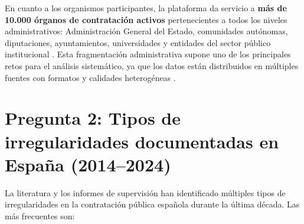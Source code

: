 \documentclass[11pt,a4paper,spanish]{book}
\numberwithin{equation}{chapter}
\numberwithin{figure}{chapter}
\begin{document}
En cuanto a los organismos participantes, la plataforma da servicio a \textbf{m{\'a}s de 10.000 {\'o}rganos de contrataci{\'o}n activos} pertenecientes a todos los niveles administrativos: Administraci{\'o}n General del Estado, comunidades aut{\'o}nomas, diputaciones, ayuntamientos, universidades y entidades del sector p{\'u}blico institucional \cite{MinHacienda2024PLACE}. Esta fragmentaci{\'o}n administrativa supone uno de los principales retos para el an{\'a}lisis sistem{\'a}tico, ya que los datos est{\'a}n distribuidos en m{\'u}ltiples fuentes con formatos y calidades heterog{\'e}neas \cite{OCP2023EUOpenData}.

\section{Pregunta 2: Tipos de irregularidades documentadas en Espa{\~n}a (2014--2024)}

La literatura y los informes de supervisi{\'o}n han identificado m{\'u}ltiples tipos de irregularidades en la contrataci{\'o}n p{\'u}blica espa{\~n}ola durante la {\'u}ltima d{\'e}cada. Las m{\'a}s frecuentes son:
\end{document}
